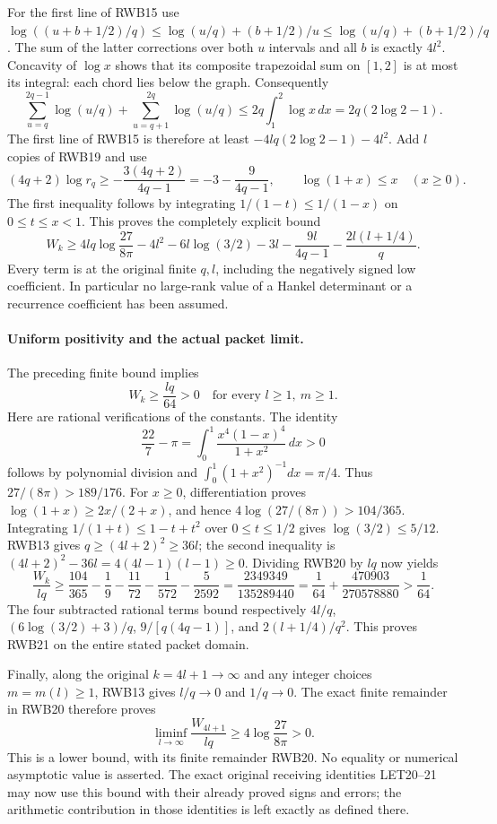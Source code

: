 For the first line of RWB15 use
$\log((u+b+1/2)/q)\le\log(u/q)+(b+1/2)/u
\le\log(u/q)+(b+1/2)/q$. The sum of the latter corrections over
both $u$ intervals and all $b$ is exactly $4l^2$.
Concavity of $\log x$ shows that its composite trapezoidal sum on
$[1,2]$ is at most its integral: each chord lies below the graph.
Consequently
\[
 \sum_{u=q}^{2q-1}\log(u/q)+\sum_{u=q+1}^{2q}\log(u/q)
 \le2q\int_1^2\log x\,dx=2q(2\log2-1).
\]
The first line of RWB15 is therefore at least
$-4lq(2\log2-1)-4l^2$. Add $l$ copies of RWB19 and use
\[
 (4q+2)\log r_q\ge-\frac{3(4q+2)}{4q-1}
 =-3-\frac9{4q-1},\qquad
 \log(1+x)\le x\quad(x\ge0).
\]
The first inequality follows by integrating
$1/(1-t)\le1/(1-x)$ on $0\le t\le x<1$.
This proves the completely explicit bound
\[
 \boxed{\displaystyle
 W_k\ge4lq\log\frac{27}{8\pi}
       -4l^2-6l\log(3/2)-3l
       -\frac{9l}{4q-1}-\frac{2l(l+1/4)}q.}
 \tag{RWB20}
\]
Every term is at the original finite $q,l$, including the negatively
signed low coefficient. In particular no large-rank value of a Hankel
determinant or a recurrence coefficient has been assumed.

\paragraph{Uniform positivity and the actual packet limit.}
The preceding finite bound implies
\[
 \boxed{\displaystyle W_k\ge\frac{lq}{64}>0
 \quad\text{for every }l\ge1,\ m\ge1.}
 \tag{RWB21}
\]
Here are rational verifications of the constants. The identity
\[
 \frac{22}{7}-\pi=\int_0^1
                \frac{x^4(1-x)^4}{1+x^2}\,dx>0
\]
follows by polynomial division and $\int_0^1(1+x^2)^{-1}dx=\pi/4$.
Thus $27/(8\pi)>189/176$. For $x\ge0$, differentiation proves
$\log(1+x)\ge2x/(2+x)$, and hence
$4\log(27/(8\pi))>104/365$. Integrating
$1/(1+t)\le1-t+t^2$ over $0\le t\le1/2$ gives
$\log(3/2)\le5/12$.
RWB13 gives $q\ge(4l+2)^2\ge36l$; the second inequality is
$(4l+2)^2-36l=4(4l-1)(l-1)\ge0$. Dividing RWB20 by $lq$ now yields
\[
 \frac{W_k}{lq}\ge
 \frac{104}{365}-\frac19-\frac{11}{72}-\frac1{572}
                    -\frac5{2592}
 =\frac{2349349}{135289440}
 =\frac1{64}+\frac{470903}{270578880}>\frac1{64}.
 \tag{RWB22}
\]
The four subtracted rational terms bound respectively
$4l/q$, $(6\log(3/2)+3)/q$, $9/[q(4q-1)]$, and
$2(l+1/4)/q^2$. This proves RWB21 on the entire stated packet domain.

Finally, along the original $k=4l+1\to\infty$ and any integer choices
$m=m(l)\ge1$, RWB13 gives $l/q\to0$ and $1/q\to0$.
The exact finite remainder in RWB20 therefore proves
\[
 \boxed{\displaystyle
 \liminf_{l\to\infty}\frac{W_{4l+1}}{lq}
 \ge4\log\frac{27}{8\pi}>0.}
 \tag{RWB23}
\]
This is a lower bound, with its finite remainder RWB20. No equality
or numerical asymptotic value is asserted. The exact original receiving
identities LET20--21 may now use this bound with their already proved
signs and errors; the arithmetic contribution in those identities is
left exactly as defined there.

